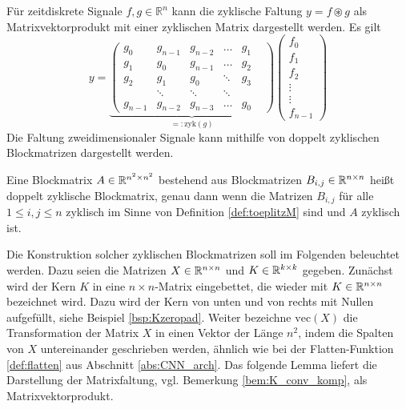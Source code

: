 Für zeitdiskrete Signale $f,g \in \mathbb{R}^{n}$ kann die zyklische Faltung $y=f \circledast g$ als Matrixvektorprodukt mit einer zyklischen Matrix dargestellt werden. Es gilt 
\begin{equation*}
    y=\underbrace{\begin{pmatrix}
        g_0 & g_{n-1} &g_{n-2} &\ldots &g_1 \\ 
        g_1 & g_0 &g_{n-1} &\ldots &g_2 \\
        g_2 &g_1 &g_0 &\ddots &g_3\\
        &\ddots &\ddots &\ddots & & \\
        g_{n-1} &g_{n-2} &g_{n-3} &\ldots &g_0
    \end{pmatrix}}_{=:\mathrm{zyk}(g)}
    \begin{pmatrix}
        f_0 \\
        f_1 \\
        f_2 \\
        \vdots \\
        \vdots \\
        f_{n-1}
    \end{pmatrix}
\end{equation*}
Die Faltung zweidimensionaler Signale kann mithilfe von doppelt zyklischen Blockmatrizen dargestellt werden.
\begin{defi}
    \label{def:double_circ}
    Eine Blockmatrix $A \in \mathbb{R}^{n^2 \times n^2}$ bestehend aus Blockmatrizen $B_{i,j} \in \mathbb{R}^{n \times n}$ heißt doppelt zyklische Blockmatrix, genau dann wenn die Matrizen $B_{i,j}$ für alle $ 1 \leq i, j \leq n$ zyklisch im Sinne von Definition \ref{def:toeplitzM} sind und $A$ zyklisch ist.
\end{defi}

Die Konstruktion solcher zyklischen Blockmatrizen soll im Folgenden beleuchtet werden. Dazu seien die Matrizen $X \in \mathbb{R}^{n \times n}$ und $K \in \mathbb{R}^{k \times k}$ gegeben. Zunächst wird der Kern $K$ in eine $n \times n$-Matrix eingebettet, die wieder mit $K \in \mathbb{R}^{n \times n}$ bezeichnet wird. Dazu wird der Kern von unten und von rechts mit Nullen aufgefüllt, siehe Beispiel \ref{bsp:Kzeropad}.
Weiter bezeichne $\mathrm{vec}(X)$ die Transformation der Matrix $X$ in einen Vektor der Länge $n^2$, indem die Spalten von $X$ untereinander geschrieben werden, ähnlich wie bei der Flatten-Funktion \ref{def:flatten} aus Abschnitt \ref{abs:CNN_arch}. Das folgende Lemma liefert die Darstellung der Matrixfaltung, vgl. Bemerkung \ref{bem:K_conv_komp}, als Matrixvektorprodukt.

